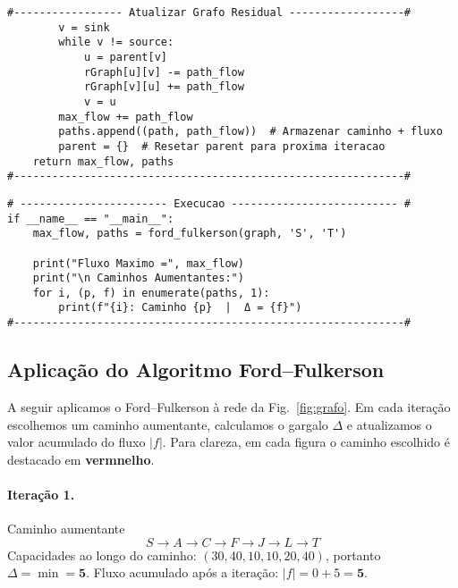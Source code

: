 \documentclass[12pt]{article}
\begin{document}
\begin{lstlisting}
#----------------- Atualizar Grafo Residual ------------------#
        v = sink
        while v != source:
            u = parent[v]
            rGraph[u][v] -= path_flow
            rGraph[v][u] += path_flow
            v = u
        max_flow += path_flow
        paths.append((path, path_flow))  # Armazenar caminho + fluxo
        parent = {}  # Resetar parent para proxima iteracao
    return max_flow, paths
#-------------------------------------------------------------#
\end{lstlisting}

\begin{lstlisting}
# ----------------------- Execucao -------------------------- #
if __name__ == "__main__":
    max_flow, paths = ford_fulkerson(graph, 'S', 'T')

    print("Fluxo Maximo =", max_flow)
    print("\n Caminhos Aumentantes:")
    for i, (p, f) in enumerate(paths, 1):
        print(f"{i}: Caminho {p}  |  Δ = {f}")
#-------------------------------------------------------------#
\end{lstlisting}



\newpage
\subsection{Aplicação do Algoritmo Ford--Fulkerson}

A seguir aplicamos o Ford--Fulkerson à rede da Fig.~\ref{fig:grafo}. Em cada iteração escolhemos um caminho aumentante, calculamos o gargalo \(\Delta\) e atualizamos o valor acumulado do fluxo \( |f|\). Para clareza, em cada figura o caminho escolhido é destacado em \textbf{vermnelho}.


\paragraph{Iteração 1.} Caminho aumentante
\[
S \to A \to C \to F \to J \to L \to T
\]
Capacidades ao longo do caminho: \((30,40,10,10,20,40)\), portanto \(\Delta = \min = \mathbf{5}\).
Fluxo acumulado após a iteração: \(|f|= 0+5 = \mathbf{5}\).
\end{document}
